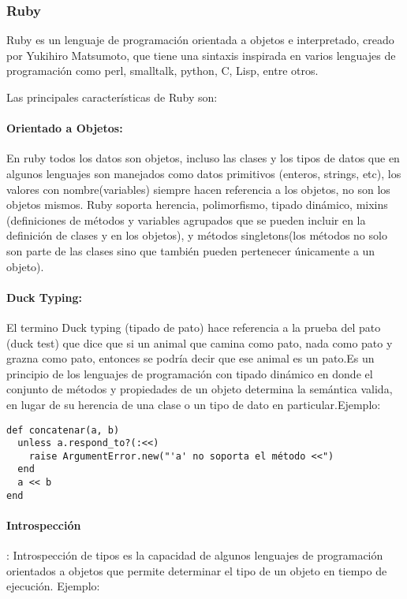 \subsubsection*{Ruby \cite{ruby_lang} }
\label{tec:ruby}

Ruby es un lenguaje de programación orientada a objetos e interpretado, creado por Yukihiro Matsumoto, que tiene una sintaxis inspirada en varios lenguajes de programación como perl, smalltalk, python, C, Lisp, entre otros.

Las principales características de Ruby son:

\paragraph{Orientado a Objetos:}
En ruby todos los datos son objetos, incluso las clases y los tipos de datos que en algunos lenguajes son manejados como datos primitivos (enteros, strings, etc), los valores con nombre(variables) siempre hacen referencia a los objetos, no son los objetos mismos. \newline Ruby soporta herencia, polimorfismo, tipado dinámico, mixins (definiciones de métodos y variables agrupados que se pueden incluir en la definición de clases y en los objetos), y métodos singletons(los métodos no solo son parte de las clases sino que también pueden pertenecer únicamente a un objeto).

\paragraph{Duck Typing:}
El termino Duck typing (tipado de pato) hace referencia a la prueba del pato (duck test) que dice que si un animal que camina como pato, nada como pato y grazna como pato, entonces se podría decir que ese animal es un pato.\newline Es un principio de los lenguajes de programación con tipado dinámico en donde el conjunto de métodos y propiedades de un objeto determina la semántica valida, en lugar de su herencia de una clase o un tipo de dato en particular.\newline Ejemplo:

\begin{verbatim}
def concatenar(a, b)
  unless a.respond_to?(:<<)
    raise ArgumentError.new("'a' no soporta el método <<")
  end
  a << b
end
\end{verbatim}

\paragraph{Introspección}:
Introspección de tipos es la capacidad de algunos lenguajes de programación orientados a objetos que permite determinar el tipo de un objeto en tiempo de ejecución. \newline Ejemplo:

